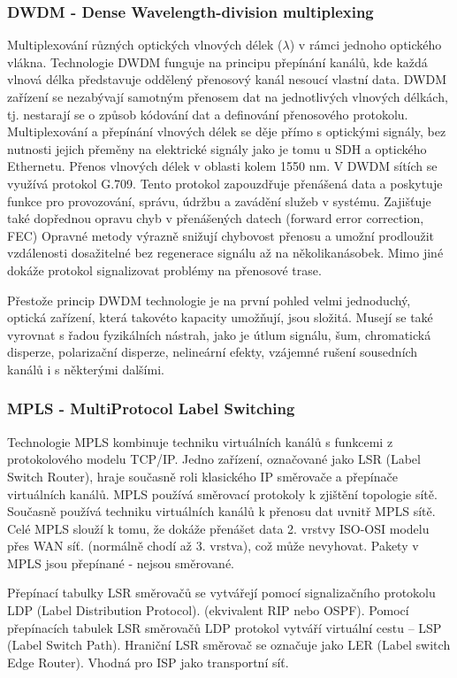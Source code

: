 \subsubsection{DWDM - Dense Wavelength-division multiplexing}
Multiplexování různých optických vlnových délek ($\lambda$) v rámci jednoho optického vlákna. Technologie DWDM funguje na principu přepínání kanálů, kde každá vlnová délka představuje oddělený přenosový kanál nesoucí vlastní data. DWDM zařízení se nezabývají samotným přenosem dat na jednotlivých vlnových délkách, tj. nestarají se o způsob kódování dat a definování přenosového protokolu. Multiplexování a přepínání vlnových délek se děje přímo s optickými signály, bez nutnosti jejich přeměny na elektrické signály jako je tomu u SDH a optického Ethernetu. Přenos vlnových délek v oblasti kolem 1550 nm. V DWDM sítích se využívá protokol G.709. Tento protokol zapouzdřuje přenášená data a poskytuje funkce pro provozování, správu, údržbu a zavádění služeb v systému. Zajišťuje také dopřednou opravu chyb v přenášených datech (forward error correction, FEC) 
Opravné metody výrazně snižují chybovost přenosu a umožní prodloužit vzdálenosti dosažitelné bez regenerace signálu až na několikanásobek. Mimo jiné dokáže protokol signalizovat problémy na přenosové trase. 


Přestože princip DWDM technologie je na první pohled velmi jednoduchý, optická zařízení, která takovéto kapacity umožňují, jsou složitá. Musejí se také vyrovnat s řadou fyzikálních nástrah, jako je útlum signálu, šum, chromatická disperze, polarizační disperze, nelineární efekty, vzájemné rušení sousedních kanálů i s některými dalšími. 

\subsubsection{MPLS - MultiProtocol Label Switching}
Technologie MPLS kombinuje techniku virtuálních kanálů s funkcemi z protokolového modelu TCP/IP. Jedno zařízení, označované jako LSR (Label Switch Router), hraje současně roli klasického IP směrovače a přepínače virtuálních kanálů. MPLS používá směrovací protokoly k zjištění topologie sítě. Současně používá techniku virtuálních kanálů k přenosu dat uvnitř MPLS sítě. Celé MPLS slouží k tomu, že dokáže přenášet data 2. vrstvy ISO-OSI modelu přes WAN síť. (normálně chodí až 3. vrstva), což může nevyhovat. Pakety v MPLS jsou přepínané - nejsou směrované. 

Přepínací tabulky LSR směrovačů se vytvářejí pomocí signalizačního protokolu LDP (Label Distribution Protocol). (ekvivalent RIP nebo OSPF). Pomocí přepínacích tabulek LSR směrovačů LDP protokol vytváří virtuální cestu – LSP (Label Switch Path). Hraniční LSR směrovač se označuje jako LER (Label switch Edge Router). Vhodná pro ISP jako transportní síť.

